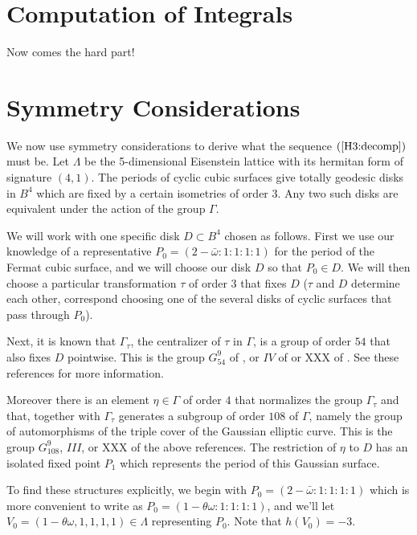 \documentclass[11pt]{amsart}
\begin{document}
\section{Computation of Integrals}

Now comes the hard part!

\section{Symmetry Considerations}

We now use symmetry considerations to derive what the sequence $(\ref{H3:decomp})$ must be.   Let $\Lambda$ be the 5-dimensional Eisenstein lattice with its hermitan form of signature $(4,1)$.  The periods of cyclic cubic surfaces give totally geodesic disks  in $B^4$ which are fixed by a certain isometries of  order $3$.   Any two such disks are equivalent under the action of the group $\Gamma$.

We will work with one specific disk $D\subset B^4$ chosen as follows.   First we use our knowledge of a representative $P_0 = (2-\bar\omega:1:1:1:1)$ for the period of the Fermat cubic surface, and we will choose our disk $D$ so that $P_0\in D$.  We will then choose a particular transformation $\tau$ of order $3$ that fixes $D$ ($\tau$ and $D$ determine each other, correspond choosing one of the several disks of cyclic surfaces that pass through $P_0$).

Next, it is known that $\Gamma_\tau$, the centralizer of $\tau$ in $\Gamma$, is a group of order $54$ that also fixes $D$ pointwise.   This is the group $G_{54}^9$ of \cite{Hosoh}, or $IV$ of \cite{Dolgachev} or XXX of \cite{Segre}.  See these references for more information.

 Moreover there is an element $\eta\in\Gamma$ of order $4$ that normalizes the group $\Gamma_\tau$ and that, together with $\Gamma_\tau$ generates a subgroup of order $108$ of $\Gamma$, namely the group of automorphisms of the triple cover of the Gaussian elliptic curve.  This is the group $G_{108}^9$, $III$, or XXX of the above references.   The restriction of $\eta$ to $D$ has an isolated fixed point $P_1$ which represents the period of this Gaussian surface.
 
 To find these structures explicitly, we begin with $P_0 = (2 - \bar\omega :1:1:1:1)$ which is more convenient to write as $P_0 = (1- \theta\omega :1:1:1:1)$, and we'll let $V_0 = (1-\theta\omega,1,1,1,1)\in\Lambda$ representing $P_0$.  Note that $h(V_0) = -3$.  
 
\end{document}
